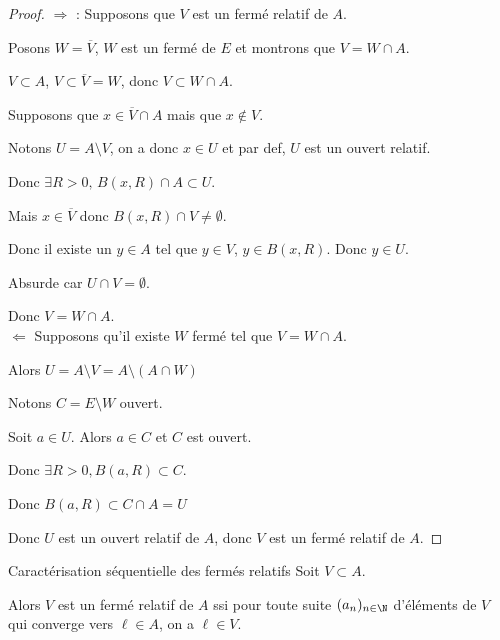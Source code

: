 \begin{proof}
    $\Rightarrow$ : Supposons que $V$ est un fermé relatif de $A$.

    Posons $W = \overline{V}$, $W$ est un fermé de $E$ et montrons que $V = W \cap A$.

    $V \subset A$, $V \subset \overline V = W$, donc $V \subset W \cap A$.

    Supposons que $x \in \overline V \cap A$ mais que $x \not \in V$.

    Notons $U = A \setminus V$, on a donc $x \in U$ et par def, $U$ est un ouvert relatif. 

    Donc $\exists R > 0, \, B(x, R) \cap A \subset U$.

    Mais $x \in  \overline V$ donc $B(x, R) \cap V \neq \emptyset$.

    Donc il existe un $y \in A$ tel que $y \in V$, $y \in B(x, R)$. Donc $y \in U$.

    Absurde car $U \cap V = \emptyset$.

    Donc $V = W \cap A$. \\

    $\Leftarrow$ Supposons qu'il existe $W$ fermé tel que $V = W \cap A$. 

    Alors $U = A \setminus V = A \setminus (A \cap W)$

    Notons $C = E \setminus W$ ouvert.

    Soit $a \in U$. Alors $a \in C$ et $C$ est ouvert. 

    Donc $\exists R > 0, B(a, R) \subset C$.

    Donc $B(a, R) \subset C \cap A = U$ 

    Donc $U$ est un ouvert relatif de $A$, donc $V$ est un fermé relatif de $A$.
\end{proof}


\begin{proposition}{Caractérisation séquentielle des fermés relatifs}{}
    Soit $V \subset A$. 

    Alors $V$ est un fermé relatif de $A$ ssi pour toute suite $(a_n)_{n \in \N}$ d'éléments de $V$
    qui converge vers $\ell \in A$, on a $\ell \in V$.
    
\end{proposition}


